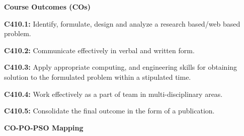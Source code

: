 \begin{flushleft}
{\size\textbf{Course Outcomes (COs)}}
\end{flushleft}

\noindent\textbf{C410.1:} Identify, formulate, design and analyze a research based/web based problem.

\noindent\textbf{C410.2:} Communicate effectively in verbal and written form.

\noindent\textbf{C410.3:} Apply appropriate computing, and engineering skills for obtaining solution to the formulated problem within a stipulated time.

\noindent\textbf{C410.4:} Work effectively as a part of team in multi-disciplinary areas.

\noindent\textbf{C410.5:} Consolidate the final outcome in the form of a publication.

\vspace{5mm}

\begin{flushleft}
{\size\textbf{CO-PO-PSO Mapping}}
\end{flushleft}

\begin{table}[h!]
\renewcommand{\arraystretch}{2}
\setlength{\tabcolsep}{2.5pt}
\centering
{}
\end{table}
